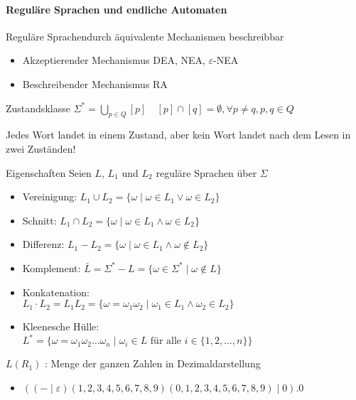 \graphicspath{{images/}}

\paragraph{Reguläre Sprachen und endliche Automaten}

\begin{concept}{Reguläre Sprachen}durch äquivalente Mechanismen beschreibbar
    \begin{itemize}
        \item Akzeptierender Mechanismus
         DEA, NEA, $\varepsilon$-NEA
        \item Beschreibender Mechanismus RA
    \end{itemize}
\end{concept}

\begin{definition}{Zustandsklasse}
    $\Sigma^{*}=\bigcup_{p \in Q}[p] \quad [p] \cap[q]=\emptyset, \forall p \neq q, p, q \in Q$

    Jedes Wort landet in einem Zustand, aber kein Wort landet nach dem Lesen in zwei Zuständen!
\end{definition}

\begin{theorem}{Eigenschaften}
    Seien $L$, $L_{1}$ und $L_{2}$ reguläre Sprachen über $\Sigma$
    \begin{itemize}
        \item Vereinigung: $L_{1} \cup L_{2}=\{\omega \mid \omega \in L_{1} \vee \omega \in L_{2}\}$
        \item Schnitt: $L_{1} \cap L_{2}=\{\omega \mid \omega \in L_{1} \wedge \omega \in L_{2}\}$
        \item Differenz: $L_{1}-L_{2}=\{\omega \mid \omega \in L_{1} \wedge \omega \notin L_{2}\}$
        \item Komplement: $\bar{L}=\Sigma^{*}-L=\{\omega \in \Sigma^{*} \mid \omega \notin L\}$
        \item Konkatenation:\\
        $L_{1} \cdot L_{2}= L_{1} L_{2} = \{\omega=\omega_{1} \omega_{2} \mid \omega_{1} \in L_{1} \wedge \omega_{2} \in L_{2}\}$
        \item Kleenesche Hülle:\\
        $L^{*}=\{\omega=\omega_{1} \omega_{2} \ldots \omega_{n} \mid \omega_{i} \in L \text { für alle } i \in\{1,2, \ldots, n\}\}$
    \end{itemize}
\end{theorem}

\begin{remark}
    $L\left(R_{1}\right)$ : Menge der ganzen Zahlen in Dezimaldarstellung
    \begin{itemize}
    \item $((-\mid \varepsilon)(1,2,3,4,5,6,7,8,9)(0,1,2,3,4,5,6,7,8,9) \mid 0) .0$
    \end{itemize}
\end{remark}

